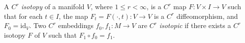 A $C^r$ \textit{isotopy} of a manifold $V$, where $1 \leqslant r < \infty$, is a $C^r$ map $F: V \times I \to V$ such that for each $t \in I$, the map $F_t = F(\cdot, t): V \to V$ is a $C^r$ diffeomorphism, and $F_0 = \mathrm{id}_V$. Two $C^r$ embeddings $f_0, f_1: M \to V$ are $C^r$ \textit{isotopic} if there exists a $C^r$ isotopy $F$ of $V$ such that $F_1 \circ f_0 = f_1$.
